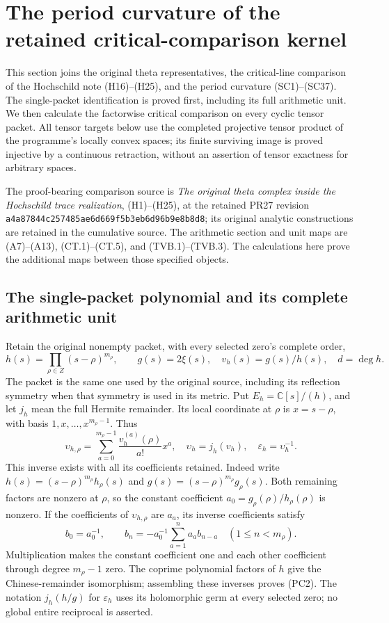 \section{The period curvature of the retained critical-comparison kernel}
\label{sec:period-critical-kernel-bridge}

This section joins the original theta representatives, the critical-line
comparison of the Hochschild note (H16)--(H25), and the period curvature
(SC1)--(SC37).  The single-packet identification is proved first, including
its full arithmetic unit.  We then calculate the factorwise critical
comparison on every cyclic tensor packet.  All tensor targets below use
the completed projective tensor product of the programme's locally convex
spaces; its finite surviving image is proved injective by a continuous
retraction, without an assertion of tensor exactness for arbitrary spaces.

The proof-bearing comparison source is
\emph{The original theta complex inside the Hochschild trace realization},
(H1)--(H25), at the retained PR27 revision
\nolinkurl{a4a87844c257485ae6d669f5b3eb6d96b9e8b8d8}; its original
analytic constructions are retained in the cumulative source.
The arithmetic section and unit maps are (A7)--(A13), (CT.1)--(CT.5),
and (TVB.1)--(TVB.3).  The calculations here prove the additional maps
between those specified objects.

\subsection{The single-packet polynomial and its complete arithmetic unit}

Retain the original nonempty packet, with every selected zero's complete
order,
\[
 h(s)=\prod_{\rho\in Z}(s-\rho)^{m_\rho},\qquad
 g(s)=2\xi(s),\quad v_h(s)=g(s)/h(s),\quad d=\deg h.
 \tag{PC1}
\]
The packet is the same one used by the original source, including its
reflection symmetry when that symmetry is used in its metric.  Put
$E_h=\mathbb C[s]/(h)$, and let $j_h$ mean the full Hermite remainder.
Its local coordinate at $\rho$ is $x=s-\rho$, with basis
$1,x,\ldots,x^{m_\rho-1}$.  Thus
\[
 \upsilon_{h,\rho}
   =\sum_{a=0}^{m_\rho-1}\frac{v_h^{(a)}(\rho)}{a!}x^a,
 \quad\upsilon_h=j_h(v_h),\quad
 \varepsilon_h=\upsilon_h^{-1}.
 \tag{PC2}
\]
This inverse exists with all its coefficients retained.  Indeed write
$h(s)=(s-\rho)^{m_\rho}h_\rho(s)$ and
$g(s)=(s-\rho)^{m_\rho}g_\rho(s)$.  Both remaining factors are nonzero
at $\rho$, so the constant coefficient
$a_0=g_\rho(\rho)/h_\rho(\rho)$ is nonzero.  If the coefficients
of $\upsilon_{h,\rho}$ are $a_a$, its inverse coefficients satisfy
\[
 b_0=a_0^{-1},\qquad
 b_n=-a_0^{-1}\sum_{a=1}^n a_a b_{n-a}\quad(1\le n<m_\rho).
 \tag{PC3}
\]
Multiplication makes the constant coefficient one and each other
coefficient through degree $m_\rho-1$ zero.  The coprime polynomial
factors of $h$ give the Chinese-remainder isomorphism; assembling these
inverses proves (PC2).  The notation $j_h(h/g)$ for $\varepsilon_h$
uses its holomorphic germ at every selected zero; no global entire
reciprocal is asserted.


